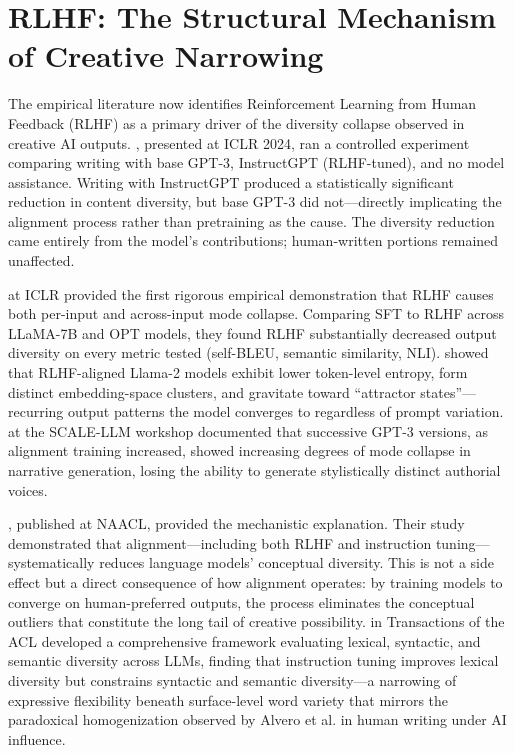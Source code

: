 \documentclass[12pt,a4paper]{article}
\begin{document}
\section{RLHF: The Structural Mechanism of Creative Narrowing}
The empirical literature now identifies Reinforcement Learning from Human Feedback (RLHF) as a primary driver of the diversity collapse observed in creative AI outputs. \citet{padmakumar2024}, presented at ICLR 2024, ran a controlled experiment comparing writing with base GPT-3, InstructGPT (RLHF-tuned), and no model assistance. Writing with InstructGPT produced a statistically significant reduction in content diversity, but base GPT-3 did not---directly implicating the alignment process rather than pretraining as the cause. The diversity reduction came entirely from the model's contributions; human-written portions remained unaffected.

\citet{kirk2024} at ICLR provided the first rigorous empirical demonstration that RLHF causes both per-input and across-input mode collapse. Comparing SFT to RLHF across LLaMA-7B and OPT models, they found RLHF substantially decreased output diversity on every metric tested (self-BLEU, semantic similarity, NLI). \citet{mohammadi2024} showed that RLHF-aligned Llama-2 models exhibit lower token-level entropy, form distinct embedding-space clusters, and gravitate toward ``attractor states''---recurring output patterns the model converges to regardless of prompt variation. \citet{hamilton2024} at the SCALE-LLM workshop documented that successive GPT-3 versions, as alignment training increased, showed increasing degrees of mode collapse in narrative generation, losing the ability to generate stylistically distinct authorial voices.

\citet{krishnamurthy2025}, published at NAACL, provided the mechanistic explanation. Their study demonstrated that alignment---including both RLHF and instruction tuning---systematically reduces language models' conceptual diversity. This is not a side effect but a direct consequence of how alignment operates: by training models to converge on human-preferred outputs, the process eliminates the conceptual outliers that constitute the long tail of creative possibility. \citet{guo2025} in Transactions of the ACL developed a comprehensive framework evaluating lexical, syntactic, and semantic diversity across LLMs, finding that instruction tuning improves lexical diversity but constrains syntactic and semantic diversity---a narrowing of expressive flexibility beneath surface-level word variety that mirrors the paradoxical homogenization observed by Alvero et al. in human writing under AI influence.
\end{document}

